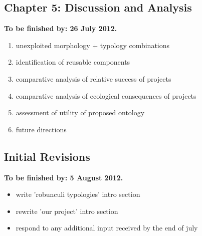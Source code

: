 \documentclass[12pt,letterpaper,notitlepage,onecolumn]{article}
\begin{document}
\subsection{Chapter 5: Discussion and Analysis}
%
\textbf{To be finished by: 26 July 2012.}

\begin{enumerate}
    \item unexploited morphology + typology combinations
    \item identification of reusable components
    \item comparative analysis of relative success of projects
    \item comparative analysis of ecological consequences of projects
    \item assessment of utility of proposed ontology
    \item future directions
\end{enumerate}


\subsection{Initial Revisions}
%
\textbf{To be finished by: 5 August 2012.}

\begin{itemize}
    \item write 'robunculi typologies' intro section
    \item rewrite 'our project' intro section
    \item respond to any additional input received by the end of july 
\end{itemize}
\end{document}
